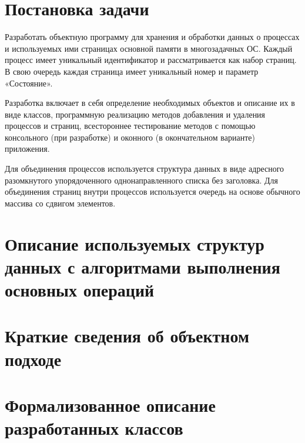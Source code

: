 \documentclass[russian,utf8,nocolumnsxix,nocolumnxxxii,nocolumnxxxi,hpadding=10mm]{eskdtext}
\begin{document}
\maketitle
\newpage
{}
\sloppy

\linespread{1,4}
\tableofcontents

\newpage
\parindent=12.5mm
\linespread{1,5}
\section{Постановка задачи}

Разработать объектную программу для хранения и обработки данных о процессах и используемых ими страницах основной памяти в многозадачных ОС. Каждый процесс имеет уникальный идентификатор и рассматривается как набор страниц. В свою очередь каждая страница имеет уникальный номер и параметр «Состояние».

Разработка включает в себя определение необходимых объектов и описание их в виде классов, программную реализацию методов добавления и удаления процессов и страниц, всестороннее тестирование методов с помощью консольного (при разработке) и оконного (в окончательном варианте) приложения.

Для объединения процессов используется структура данных в виде адресного разомкнутого упорядоченного однонаправленного списка без заголовка. Для объединения страниц внутри процессов  используется очередь на основе обычного массива со сдвигом элементов.

\newpage
\parindent=12.5mm
\linespread{1,5}
\section{Описание используемых структур данных с алгоритмами выполнения основных операций}




\newpage
\parindent=12.5mm
\linespread{1,5}
\section{Краткие сведения об объектном подходе}

\newpage
\parindent=12.5mm
\linespread{1,5}
\section{Формализованное описание разработанных классов}

\newpage
\parindent=12.5mm
\linespread{1,5}
\end{document}
